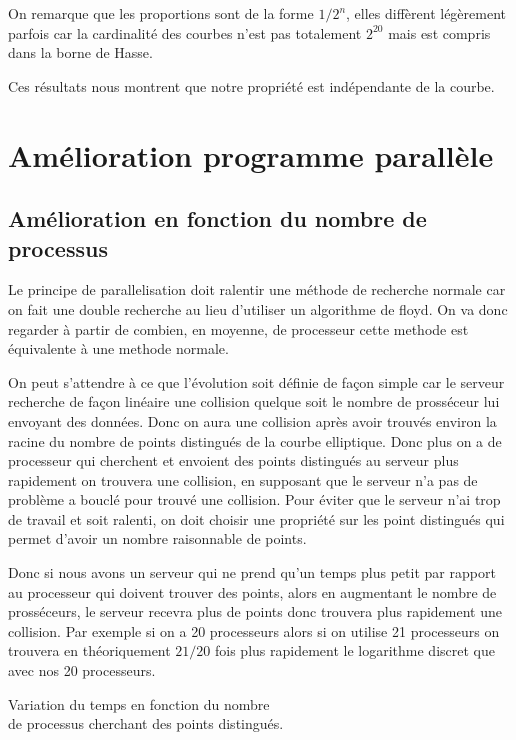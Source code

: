 \documentclass[a4paper,10pt]{report}
\begin{document}
On remarque que les proportions sont de la forme $1/2^n$, elles diffèrent légèrement parfois car la cardinalité des courbes n'est pas
totalement $2^{20}$ mais est compris dans la borne de Hasse.

Ces résultats nous montrent que notre propriété est indépendante de la courbe.

\section{Amélioration programme parallèle}

\subsection{Amélioration en fonction du nombre de processus}

Le principe de parallelisation doit ralentir une méthode de recherche normale car on fait une double recherche au lieu d'utiliser
un algorithme de floyd. On va donc regarder à partir de combien, en moyenne, de processeur cette methode est équivalente à une methode normale.

On peut s'attendre à ce que l'évolution soit définie de façon simple car le serveur recherche de façon linéaire une collision quelque soit le nombre de prosséceur lui envoyant des données.
Donc on aura une collision après avoir trouvés environ la racine du nombre de points distingués de la courbe elliptique. Donc plus on a de processeur qui cherchent et envoient des 
points distingués au serveur plus rapidement on trouvera une collision, en supposant que le serveur n'a pas de problème a bouclé pour trouvé une collision. Pour éviter que le serveur n'ai trop de travail 
et soit ralenti, on doit choisir une propriété sur les point distingués qui permet d'avoir un nombre raisonnable de points.

Donc si nous avons un serveur qui ne prend qu'un temps plus petit par rapport au processeur qui doivent trouver des points, alors en augmentant le nombre de prosséceurs, le serveur recevra plus de points 
donc trouvera plus rapidement une collision. Par exemple si on a 20 processeurs alors si on utilise 21 processeurs on trouvera en théoriquement $21/20$ fois plus rapidement le logarithme discret que avec nos 20 processeurs.

\begin{center}
	Variation du temps en fonction du nombre\\
	de processus cherchant des points distingués.
\end{center}
\end{document}
